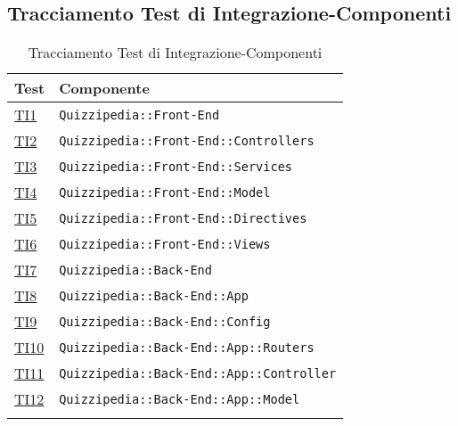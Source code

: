 \subsection{Tracciamento Test di Integrazione-Componenti}
\normalsize
\begin{longtable}[ht]{|>{\centering}m{3cm}|m{9cm}<{\centering}|}
\hline 
\textbf{Test} & \textbf{Componente}\\
\hline
\endhead
\hyperlink{TI1}{TI1} & {\texttt{Quizzipedia::Front-End}}\\ \hline
\hyperlink{TI2}{TI2} & {\texttt{Quizzipedia::Front-End::Controllers}}\\ \hline
\hyperlink{TI3}{TI3} & {\texttt{Quizzipedia::Front-End::Services}}\\ \hline
\hyperlink{TI4}{TI4} & {\texttt{Quizzipedia::Front-End::Model}}\\ \hline
\hyperlink{TI5}{TI5} & {\texttt{Quizzipedia::Front-End::Directives}}\\ \hline
\hyperlink{TI6}{TI6} & {\texttt{Quizzipedia::Front-End::Views}}\\ \hline
\hyperlink{TI7}{TI7} & {\texttt{Quizzipedia::Back-End}}\\ \hline
\hyperlink{TI8}{TI8} & {\texttt{Quizzipedia::Back-End::App}}\\ \hline
\hyperlink{TI9}{TI9} & {\texttt{Quizzipedia::Back-End::Config}}\\ \hline
\hyperlink{TI10}{TI10} & {\texttt{Quizzipedia::Back-End::App::Routers}}\\ \hline
\hyperlink{TI11}{TI11} & {\texttt{Quizzipedia::Back-End::App::Controller}}\\ \hline
\hyperlink{TI12}{TI12} & {\texttt{Quizzipedia::Back-End::App::Model}}\\ \hline
\caption[Tracciamento Test di Integrazione-Componenti]{Tracciamento Test di Integrazione-Componenti}
\label{tabella:ts-requi}
\end{longtable}
\FloatBarrier


